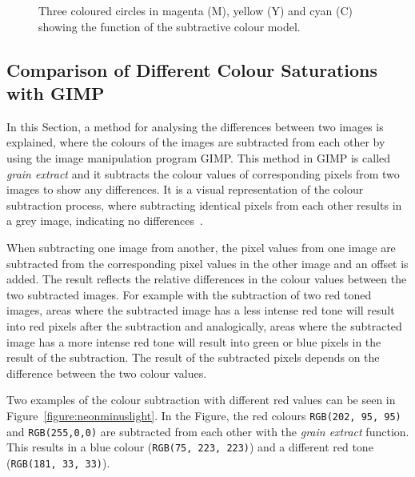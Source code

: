 \documentclass[../MasterThesis.tex]{subfiles}
\begin{document}
\begin{minipage}{0.48\textwidth}
\begin{figure}[H]
	\caption[Subtractive colour model of RGB]{Three coloured circles in magenta (M), yellow (Y) and cyan (C) showing the function of the subtractive colour model.}
	\label{figure:othercolourwheel}
	
\end{figure}
\end{minipage}

\vspace*{1em}









\subsection{Comparison of Different Colour Saturations with GIMP}
\label{subsection:ComparisonOfDifferentColourSaturations}



In this Section, a method for analysing the differences between two images is explained, where the colours of the images are subtracted from each other by using the image manipulation program GIMP. 
This method in GIMP is called \textit{grain extract} and it subtracts the colour values of corresponding pixels from two images to show any differences. It is a visual representation of the colour subtraction process, where subtracting identical pixels from each other results in a grey image, indicating no differences~\cite{gimp}.


When subtracting one image from another, the pixel values from one image are subtracted from the corresponding pixel values in the other image and an offset is added. 
The result reflects the relative differences in the colour values between the two subtracted images. For example with the subtraction of two red toned images, areas where the subtracted image has a less intense red tone will result into red pixels after the subtraction and analogically, areas where the subtracted image has a more intense red tone will result into green or blue pixels in the result of the subtraction. The result of the subtracted pixels depends on the difference between the two colour values.


Two examples of the colour subtraction with different red values can be seen in Figure~\ref{figure:neonminuslight}. In the Figure, the red colours \texttt{RGB(202, 95, 95)} and \texttt{RGB(255,0,0)} are subtracted from each other with the \textit{grain extract} function. This results in a blue colour (\texttt{RGB(75, 223, 223)}) and a different red tone (\texttt{RGB(181, 33, 33)}). 
\end{document}
